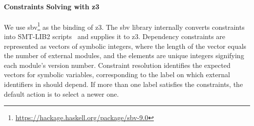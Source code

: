 \paragraph{\textbf{Constraints Solving with z3}}
We use sbv\footnote{\url{https://hackage.haskell.org/package/sbv-9.0}} as the binding of z3.
The sbv library internally converts constraints into SMT-LIB2 scripts~\cite{barrett2010smt} and supplies it to z3.
Dependency constraints are represented as vectors of symbolic integers, where the length of the vector equals the number of external modules, and the elements are unique integers signifying each module's version number. Constraint resolution identifies the expected vectors for symbolic variables, corresponding to the label on which external identifiers in \mylang{} should depend. If more than one label satisfies the constraints, the default action is to select a newer one.

